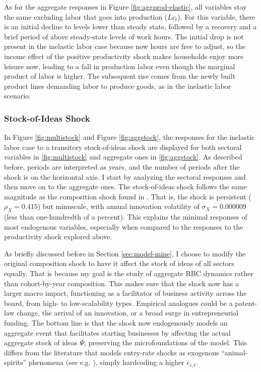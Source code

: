 \documentclass[a4paper,12pt]{article} %
\numberwithin{equation}{section} %
\numberwithin{figure}{section}
\numberwithin{table}{section}
\begin{document}
As for the aggregate
responses in Figure \ref{fig:aggprod-elastic}, all variables stay the same excluding labor that goes into production ($Lc_t$). For this variable, there
is an initial decline to levels lower than steady state, followed by a recovery and a brief period of above steady-state levels of work hours. 
The initial drop is not present in the inelastic labor case because now hours are free to adjust, so the income effect of the positive 
productivity shock makes households enjoy more leisure now, leading to a fall in production labor even though the marginal product of 
labor is higher. The subsequent rise comes from  the newly built product lines demanding labor to produce goods, as in the 
inelastic labor scenario.

\subsubsection{Stock-of-Ideas Shock}

In Figure \ref{fig:multistock} and Figure \ref{fig:aggstock}, the responses for the inelastic labor case
to a transitory stock-of-ideas shock are displayed for both sectoral variables in 
\ref{fig:multistock} and aggregate ones in \ref{fig:aggstock}. As described before, periods are interpreted as years,
and the number of periods after the shock is on the horizontal axis. I start by analyzing the sectoral responses and
then move on to the aggregate ones. The stock-of-ideas shock follows the same magnitude as the composition shock found in
\textcite{sedlavcek2017growth}. That is, the shock is persistent ($\rho_X = 0.415$) but minuscule, with annual
innovation volatility of $\sigma_X = 0.000009$ (less than one-hundredth of a percent). This explains the minimal responses of
most endogenous variables, especially when compared to the responses to the productivity shock explored above.

As briefly discussed before in Section \ref{sec:model-mine}, I choose to modify the original composition shock to have it affect the
stock of ideas of all sectors equally. That is because my goal is the study of aggregate RBC dynamics rather than cohort-by-year composition.
This makes sure that the shock now has a larger macro impact, functioning as a facilitator of business activity across the board, from high- 
to low-scalability types. Empirical analogues could be a patent-law change, the arrival of an innovation, or a broad surge in entrepreneurial 
funding. The bottom line is that the shock now endogenously models an aggregate event that facilitates starting businesses by affecting
the actual aggregate stock of ideas $\Psi$, preserving the microfoundations of the model. This differs from the literature that models entry-rate
shocks as exogenous ``animal-spirits'' phenomena (see e.g. \cite{leduc2016uncertainty}), simply hardcoding a higher $e_{i,t}$.
\end{document}
